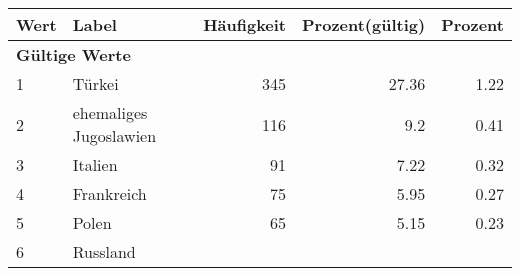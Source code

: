      \begin{longtable}{lXrrr}
     \toprule
     \textbf{Wert} & \textbf{Label} & \textbf{Häufigkeit} & \textbf{Prozent(gültig)} & \textbf{Prozent} \\
     \endhead
     \midrule
     \multicolumn{5}{l}{\textbf{Gültige Werte}}\\

     1 &
     \multicolumn{1}{X}{ Türkei   } &


       \num{345} &
       \num[round-mode=places,round-precision=2]{27,36} &
         \num[round-mode=places,round-precision=2]{1,22} \\

     2 &
     \multicolumn{1}{X}{ ehemaliges Jugoslawien   } &


       \num{116} &
       \num[round-mode=places,round-precision=2]{9,2} &
         \num[round-mode=places,round-precision=2]{0,41} \\

     3 &
     \multicolumn{1}{X}{ Italien   } &


       \num{91} &
       \num[round-mode=places,round-precision=2]{7,22} &
         \num[round-mode=places,round-precision=2]{0,32} \\

     4 &
     \multicolumn{1}{X}{ Frankreich   } &


       \num{75} &
       \num[round-mode=places,round-precision=2]{5,95} &
         \num[round-mode=places,round-precision=2]{0,27} \\

     5 &
     \multicolumn{1}{X}{ Polen   } &


       \num{65} &
       \num[round-mode=places,round-precision=2]{5,15} &
         \num[round-mode=places,round-precision=2]{0,23} \\

     6 &
     \multicolumn{1}{X}{ Russland   } &



\end{longtable}
